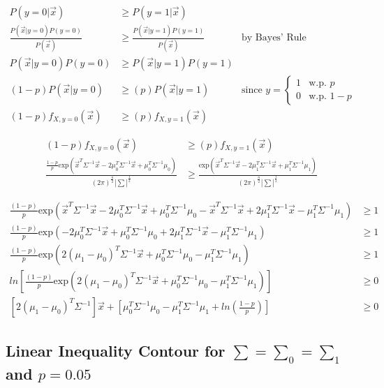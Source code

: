 \documentclass[12pt, a4paper, titlepage, fleqn]{article}
\begin{document}
\begin{align}
	P(y=0|\vec{x}) & \geq P(y=1|\vec{x})
	\\
	\frac{P(\vec{x}|y=0)P(y=0)}{P(\vec{x})} & \geq \frac{P(\vec{x}|y=1)P(y=1)}{P(\vec{x})} & \text{by Bayes' Rule}
	\\
	P(\vec{x}|y=0)P(y=0) & \geq P(\vec{x}|y=1)P(y=1)
	\\
	(1-p)P(\vec{x}|y=0) & \geq (p)P(\vec{x}|y=1) & \text{since }
	y=
		\begin{cases}
			1	& \text{w.p. } p
			\\
			0	& \text{w.p. } 1-p
		\end{cases}
	\\
	(1-p)f_{X,y=0}(\vec{x}) & \geq (p)f_{X,y=1}(\vec{x})
\end{align}

\begin{align}
	(1-p)f_{X,y=0}(\vec{x}) &\geq (p)f_{X,y=1}(\vec{x})
	\\
	\frac{\frac{1-p}{p}\text{exp}(\vec{x}^T\Sigma^{-1}\vec{x}-2\mu_0^T\Sigma^{-1}\vec{x}+\mu_0^T\Sigma^{-1}\mu_0)}{(2\pi)^{\frac{n}{2}}|\sum|^\frac{1}{2}}
	& \geq
	\frac{\text{exp}(\vec{x}^T\Sigma^{-1}\vec{x}-2\mu_1^T\Sigma^{-1}\vec{x}+\mu_1^T\Sigma^{-1}\mu_1)}{(2\pi)^{\frac{n}{2}}|\sum|^\frac{1}{2}}
\end{align}

\begin{align}
	\frac{(1-p)}{p}\text{exp}(\vec{x}^T\Sigma^{-1}\vec{x}-2\mu_0^T\Sigma^{-1}\vec{x}+\mu_0^T\Sigma^{-1}\mu_0-\vec{x}^T\Sigma^{-1}\vec{x}+2\mu_1^T\Sigma^{-1}\vec{x}-\mu_1^T\Sigma^{-1}\mu_1)
	& \geq 1
	\\
	\frac{(1-p)}{p}\text{exp}(-2\mu_0^T\Sigma^{-1}\vec{x}+\mu_0^T\Sigma^{-1}\mu_0+2\mu_1^T\Sigma^{-1}\vec{x}-\mu_1^T\Sigma^{-1}\mu_1)
	& \geq 1
	\\
	\frac{(1-p)}{p}\text{exp}(2(\mu_1-\mu_0)^T\Sigma^{-1}\vec{x}+\mu_0^T\Sigma^{-1}\mu_0-\mu_1^T\Sigma^{-1}\mu_1)
	& \geq 1
	\\
	ln[\frac{(1-p)}{p}\text{exp}(2(\mu_1-\mu_0)^T\Sigma^{-1}\vec{x}+\mu_0^T\Sigma^{-1}\mu_0-\mu_1^T\Sigma^{-1}\mu_1)]
	& \geq 0
	\\
	[2(\mu_1-\mu_0)^T\Sigma^{-1}]\vec{x}+[\mu_0^T\Sigma^{-1}\mu_0-\mu_1^T\Sigma^{-1}\mu_1+ln(\frac{1-p}{p})]
	& \geq 0
\end{align}

\pagebreak

\subsection{Linear Inequality Contour for $\sum = \sum_0 = \sum_1$ and $p=0.05$}
\end{document}

